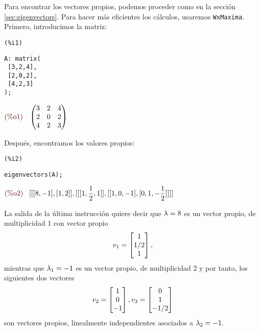 \begin{solucion}
 Para encontrar los vectores propios, podemos proceder como en la sección \ref{sec:eigenvectors}. Para hacer más
eficientes los cálculos, usaremos \texttt{WxMaxima}.
 Primero, introducimos la matriz:


\noindent
%
\begin{minipage}{8ex}{\color{red}\bf
\begin{verbatim}
(%i1)
\end{verbatim}}
\end{minipage}
\begin{minipage}{\textwidth}{\color{blue}
\begin{verbatim}
A: matrix(
 [3,2,4],
 [2,0,2],
 [4,2,3]
);
\end{verbatim}}
\end{minipage}
\begin{math}\displaystyle
\parbox{8ex}{\color{labelcolor}(\%o1) }
\begin{pmatrix}3 & 2 & 4\cr 2 & 0 & 2\cr 4 & 2 & 3\end{pmatrix}
\end{math}
%

Después, encontramos los valores propios:


\noindent
%
\begin{minipage}{8ex}{\color{red}\bf
\begin{verbatim}
(%i2)
\end{verbatim}}
\end{minipage}
\begin{minipage}{\textwidth}{\color{blue}
\begin{verbatim}
eigenvectors(A);
\end{verbatim}}
\end{minipage}
\begin{math}\displaystyle
\parbox{8ex}{\color{labelcolor}(\%o2) }
[[[8,-1],[1,2]],[[[1,\frac{1}{2},1]],[[1,0,-1],[0,1,-\frac{1}{2}]]]]
\end{math}
%

La salida de la última instrucción quiere decir que $\lambda=8$ es un vector propio, de multiplicidad 1 con vector propio$$
v_{1}=\begin{bmatrix}1 \\ 1/2 \\ 1\end{bmatrix},
$$
mientras que $\lambda_{1}=-1$ es un vector propio, de multiplicidad 2 y por tanto, los siguientes dos vectores
$$
v_{2}=\begin{bmatrix}1\\0\\-1\end{bmatrix}, v_{3}=\begin{bmatrix}0\\1\\-1/2\end{bmatrix}
$$
son vectores
propios, linealmente independientes asociados a $\lambda_{2}=-1.$


\end{solucion}
